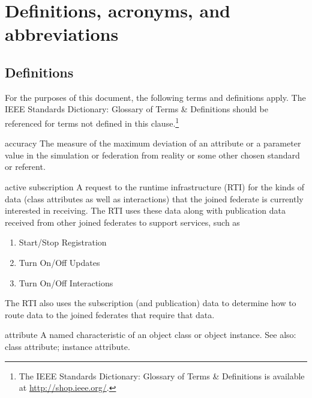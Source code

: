 \section{Definitions, acronyms, and abbreviations}

\subsection{Definitions}
For the purposes of this document, the following terms and definitions apply. The IEEE Standards Dictionary: Glossary of Terms \& Definitions should be referenced for terms not defined in this clause.\footnote{The IEEE Standards Dictionary: Glossary of Terms \& Definitions is available at \url{http://shop.ieee.org/}.}

\begin{definition}{accuracy}
    The measure of the maximum deviation of an attribute or a parameter value in the simulation or federation from reality or some other chosen standard or referent.
\end{definition}

\begin{definition}{active subscription}
    A request to the runtime infrastructure (RTI) for the kinds of data (class attributes as well as interactions) that the joined federate is currently interested in receiving. The RTI uses these data along with publication data received from other joined federates to support services, such as
    \begin{enumerate}[label=\alph*)]
\item Start/Stop Registration
\item Turn On/Off Updates
\item Turn On/Off Interactions
    \end{enumerate}
    The RTI also uses the subscription (and publication) data to determine how to route data to the joined federates that require that data.
\end{definition}

\begin{definition}{attribute}
    A named characteristic of an object class or object instance. See also: class attribute; instance attribute.
\end{definition}
